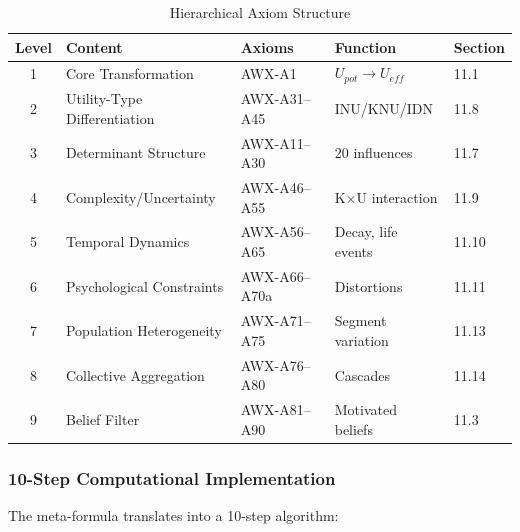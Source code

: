 \begin{table}[htbp]
\centering
\caption{Hierarchical Axiom Structure}
\label{tab:hierarchical-levels-complete}
\begin{tabular}{@{}cllll@{}}
\toprule
\textbf{Level} & \textbf{Content} & \textbf{Axioms} & \textbf{Function} & \textbf{Section} \\
\midrule
1 & Core Transformation & AWX-A1 & $U_{pot} \to U_{eff}$ & 11.1 \\
2 & Utility-Type Differentiation & AWX-A31--A45 & INU/KNU/IDN & 11.8 \\
3 & Determinant Structure & AWX-A11--A30 & 20 influences & 11.7 \\
4 & Complexity/Uncertainty & AWX-A46--A55 & K×U interaction & 11.9 \\
5 & Temporal Dynamics & AWX-A56--A65 & Decay, life events & 11.10 \\
6 & Psychological Constraints & AWX-A66--A70a & Distortions & 11.11 \\
7 & Population Heterogeneity & AWX-A71--A75 & Segment variation & 11.13 \\
8 & Collective Aggregation & AWX-A76--A80 & Cascades & 11.14 \\
9 & Belief Filter & AWX-A81--A90 & Motivated beliefs & 11.3 \\
\bottomrule
\end{tabular}
\end{table}

\subsubsection{10-Step Computational Implementation}

The meta-formula translates into a 10-step algorithm:

